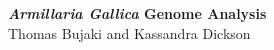 \documentclass[12pt]{article}
\begin{document}
	\begin{center}
	{\bf \Large \textit{Armillaria Gallica} Genome Analysis}\\
	Thomas Bujaki and Kassandra Dickson
	\end{center}

%
%
\end{document}
